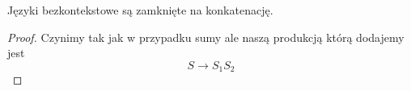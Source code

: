 \begin{theorem}
    Języki bezkontekstowe są zamknięte na konkatenację.
\end{theorem}
\begin{proof}
    Czynimy tak jak w przypadku sumy ale naszą produkcją którą dodajemy jest
    \[
        S \rightarrow S_1S_2
    \]
\end{proof}